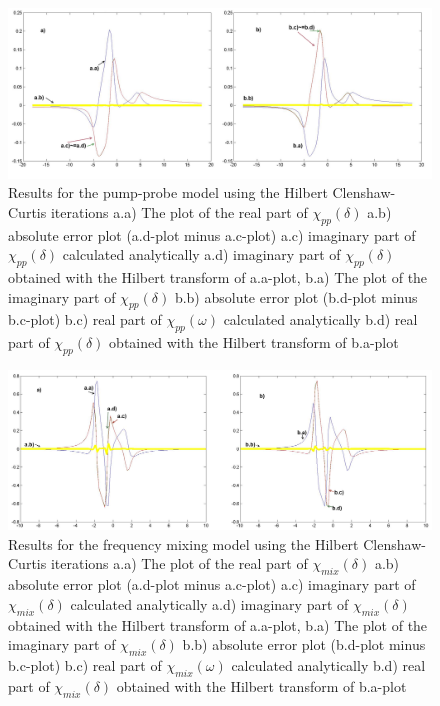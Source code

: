 \documentclass[12pt,twoside,a4paper]{article}
\numberwithin{equation}{subsection}
\numberwithin{figure}{subsection}
\begin{document}
\begin{figure} 
  \includegraphics[width=150mm]{img/hcc_pnp.png}
  \caption{Results for the pump-probe model using the Hilbert Clenshaw-Curtis iterations
     a.a) The plot of the real part of ${\chi_{pp}}(\delta )$
     a.b) absolute error plot (a.d-plot minus a.c-plot) 
     a.c) imaginary part of ${\chi_{pp}}(\delta )$ calculated analytically 
     a.d) imaginary part of ${\chi_{pp}}(\delta )$ obtained with the Hilbert transform of a.a-plot, 
     b.a) The plot of the imaginary part of ${\chi_{pp}}(\delta )$ 
     b.b) absolute error plot (b.d-plot minus b.c-plot) 
     b.c) real part of $\chi_{pp} (\omega )$ calculated analytically 
     b.d) real part of ${\chi_{pp}}(\delta )$ obtained with the Hilbert transform of b.a-plot 
     \label{fig:hcci_pnp}
     }
\end{figure} 

\begin{figure} 
  \includegraphics[width=150mm]{img/hcc_fmix.png}
  \caption{Results for the frequency mixing model using the Hilbert Clenshaw-Curtis iterations
     a.a) The plot of the real part of ${\chi_{mix}}(\delta )$
     a.b) absolute error plot (a.d-plot minus a.c-plot) 
     a.c) imaginary part of ${\chi_{mix}}(\delta )$ calculated analytically 
     a.d) imaginary part of ${\chi_{mix}}(\delta )$ obtained with the Hilbert transform of a.a-plot, 
     b.a) The plot of the imaginary part of ${\chi_{mix}}(\delta )$ 
     b.b) absolute error plot (b.d-plot minus b.c-plot) 
     b.c) real part of $\chi_{mix} (\omega )$ calculated analytically 
     b.d) real part of ${\chi_{mix}}(\delta )$ obtained with the Hilbert transform of b.a-plot 
     \label{fig:hcci_fmix}
     }
\end{figure}
\end{document}
